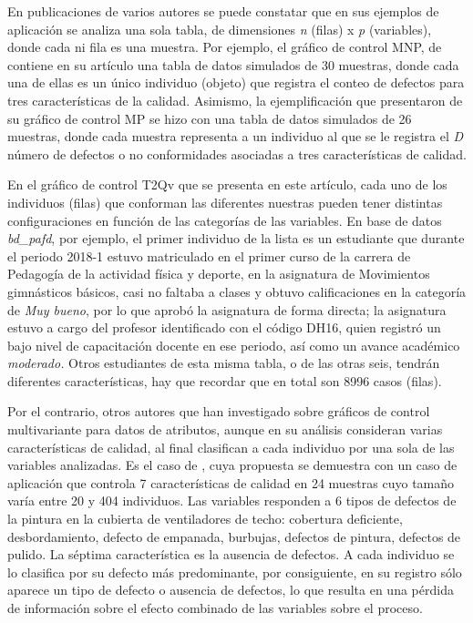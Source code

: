 \documentclass[mathematics,article,submit,moreauthors,pdftex]{mdpi}
\begin{document}
En publicaciones de varios autores se puede constatar que en sus
ejemplos de aplicación se analiza una sola tabla, de dimensiones
\emph{n} (filas) x \emph{p} (variables), donde cada ni fila es una
muestra. Por ejemplo, el gráfico de control MNP, de
\citet{lu1998control} contiene en su artículo una tabla de datos
simulados de 30 muestras, donde cada una de ellas es un único individuo
(objeto) que registra el conteo de defectos para tres características de
la calidad. Asimismo, la ejemplificación que \citet{chiu2007}
presentaron de su gráfico de control MP se hizo con una tabla de datos
simulados de 26 muestras, donde cada muestra representa a un individuo
al que se le registra el \emph{D} número de defectos o no conformidades
asociadas a tres características de calidad.

En el gráfico de control T2Qv que se presenta en este artículo, cada uno
de los individuos (filas) que conforman las diferentes nuestras pueden
tener distintas configuraciones en función de las categorías de las
variables. En base de datos \emph{bd\_pafd}, por ejemplo, el primer
individuo de la lista es un estudiante que durante el periodo 2018-1
estuvo matriculado en el primer curso de la carrera de Pedagogía de la
actividad física y deporte, en la asignatura de Movimientos gimnásticos
básicos, casi no faltaba a clases y obtuvo calificaciones en la
categoría de \emph{Muy bueno}, por lo que aprobó la asignatura de forma
directa; la asignatura estuvo a cargo del profesor identificado con el
código DH16, quien registró un bajo nivel de capacitación docente en ese
periodo, así como un avance académico \emph{moderado.} Otros estudiantes
de esta misma tabla, o de las otras seis, tendrán diferentes
características, hay que recordar que en total son 8996 casos (filas).

Por el contrario, otros autores que han investigado sobre gráficos de
control multivariante para datos de atributos, aunque en su análisis
consideran varias características de calidad, al final clasifican a cada
individuo por una sola de las variables analizadas. Es el caso de
\citet{ranjan2008multivariate}, cuya propuesta se demuestra con un caso
de aplicación que controla 7 características de calidad en 24 muestras
cuyo tamaño varía entre 20 y 404 individuos. Las variables responden a 6
tipos de defectos de la pintura en la cubierta de ventiladores de techo:
cobertura deficiente, desbordamiento, defecto de empanada, burbujas,
defectos de pintura, defectos de pulido. La séptima característica es la
ausencia de defectos. A cada individuo se lo clasifica por su defecto
más predominante, por consiguiente, en su registro sólo aparece un tipo
de defecto o ausencia de defectos, lo que resulta en una pérdida de
información sobre el efecto combinado de las variables sobre el proceso.
\end{document}
